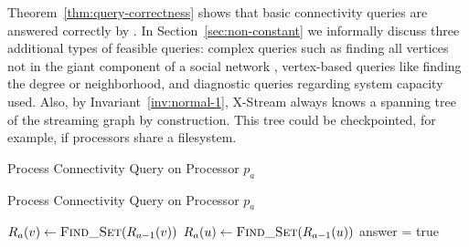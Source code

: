Theorem~\ref{thm:query-correctness} shows that basic connectivity queries are
answered correctly by \XSCCns.  In Section~\ref{sec:non-constant}
we informally discuss three additional types of feasible queries: complex queries such as
finding all vertices not in the giant component of a social network , vertex-based
queries like finding the degree or neighborhood, and diagnostic
queries regarding system capacity used.  Also, by Invariant~\ref{inv:normal-1},
X-Stream always knows a spanning tree of the streaming graph by construction. This
tree could be checkpointed, for example, if processors share a filesystem. 
\iffalse
\begin{algorithm*}
\caption{Process Connectivity Query on Processor $p_a$}\label{algo:connectq}
Process Connectivity Query on Processor $p_a$\\\makealgtitle
\begin{algorithmic}[1]
	\State $R_a(v) \gets \Call{Find\_Set}{R_{a-1}(v)}$
	\State $R_a(u) \gets \Call{Find\_Set}{R_{a-1}(u)}$
\State answer = true
\EndIf
\EndIf
\State {}
\State \Return
\EndProcedure
\end{algorithmic}
\end{algorithm*}






